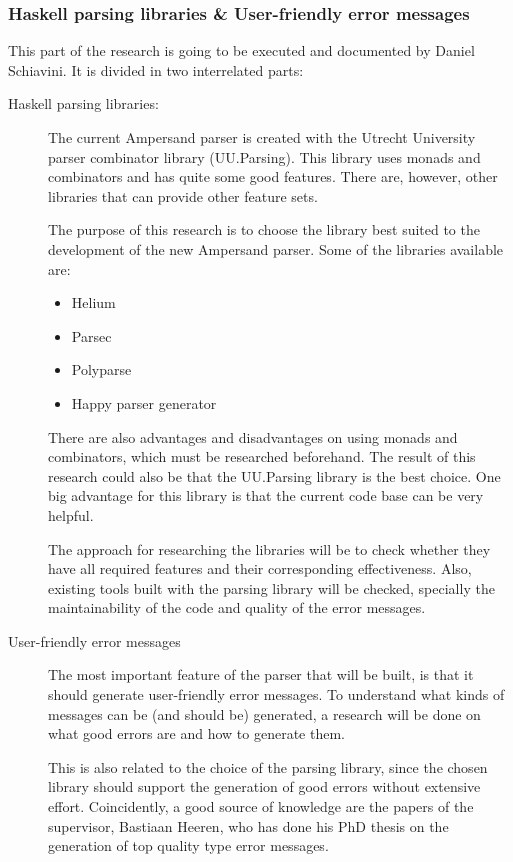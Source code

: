 \subsubsection{Haskell parsing libraries \& User-friendly error messages}
This part of the research is going to be executed and documented by Daniel Schiavini.
It is divided in two interrelated parts:
\begin{description}
	\item [Haskell parsing libraries:]
	The current Ampersand parser is created with the Utrecht University parser combinator library (UU.Parsing).
	This library uses monads and combinators and has quite some good features.
	There are, however, other libraries that can provide other feature sets.
	
	The purpose of this research is to choose the library best suited to the development of the new Ampersand parser.
	Some of the libraries available are:
	\begin{itemize}
		\item Helium
		\item Parsec
		\item Polyparse
		\item Happy parser generator
	\end{itemize}
	There are also advantages and disadvantages on using monads and combinators, which must be researched beforehand.
	The result of this research could also be that the UU.Parsing library is the best choice.
	One big advantage for this library is that the current code base can be very helpful.

	The approach for researching the libraries will be to check whether they have all required features and their corresponding effectiveness.
	Also, existing tools built with the parsing library will be checked, specially the maintainability of the code and quality of the error messages.

	\item [User-friendly error messages]
	The most important feature of the parser that will be built, is that it should generate user-friendly error messages.
	To understand what kinds of messages can be (and should be) generated, a research will be done on what good errors are and how to generate them.
	
	This is also related to the choice of the parsing library, since the chosen library should support the generation of good errors without extensive effort.
	Coincidently, a good source of knowledge are the papers of the supervisor, Bastiaan Heeren, who has done his PhD thesis on the generation of top quality type error messages\cite{heeren-error}.
\end{description}


